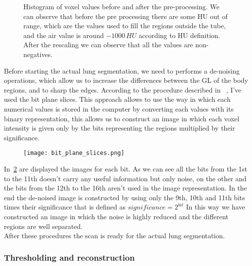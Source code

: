 \documentclass{standalone}
\begin{document}
	\begin{figure}[h]
		\centering
		\label{fig:Pre-Processing}\caption{Histogram of voxel values before and after the pre-processing. We can observe that before the pre processing there are some HU out of range, which are the values used to fill the regions outside the tube, and the air value is around $-1000\,HU$ according to HU definition. After the rescaling we can observe that all the values are non-negatives.}
	\end{figure}
	
	
	
	Before starting the actual lung segmentation, we need to performs a de-noising operations, which allow us to increase the differences between the GL of the body regions, and to sharp the edges. According to the procedure described in ~\cite{ART:Abdullah}, I've used the bit plane slices. This approach allows to use the way in which each numerical values is stored in the computer by converting  each values with its binary representation, this allows us to construct an image in which each voxel intensity is given only by the bits representing the regions multiplied by their significance.
	
	\begin{figure}[h]\label{fig:BinaryRepr}
		\centering
			\texttt{[image: bit\_plane\_slices.png]}
		\caption{}
	\end{figure}

	In \figurename\,\ref{fig:BinaryRepr} are displayed the images for each bit. As we can see all the bits from the 1st to the 11th doesn't carry any useful information but only noise, on the other and the bits from the 12th to the 16th aren't used in the image representation. In the end the de-noised image is constructed by using only the 9th, 10th and 11th bits times their significance that is defined as $significance = 2^{bit}$
	In this way we have constructed an image in which the noise is highly reduced and the different regions are well separated.\\
	After these procedures the scan is ready for the actual lung segmentation.
	
	

	\subsubsection*{Thresholding and reconstruction}
	
\end{document}
